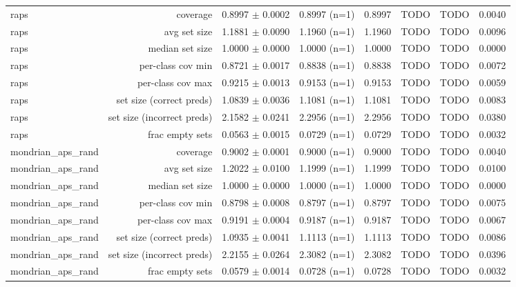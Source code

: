 \begin{table}
\begin{tabular}{lrrrrrrr}
raps & coverage & 0.8997 $\pm$ 0.0002 & 0.8997 (n=1) & 0.8997 & TODO & TODO & 0.0040 \\
raps & avg set size & 1.1881 $\pm$ 0.0090 & 1.1960 (n=1) & 1.1960 & TODO & TODO & 0.0096 \\
raps & median set size & 1.0000 $\pm$ 0.0000 & 1.0000 (n=1) & 1.0000 & TODO & TODO & 0.0000 \\
raps & per-class cov min & 0.8721 $\pm$ 0.0017 & 0.8838 (n=1) & 0.8838 & TODO & TODO & 0.0072 \\
raps & per-class cov max & 0.9215 $\pm$ 0.0013 & 0.9153 (n=1) & 0.9153 & TODO & TODO & 0.0059 \\
raps & set size (correct preds) & 1.0839 $\pm$ 0.0036 & 1.1081 (n=1) & 1.1081 & TODO & TODO & 0.0083 \\
raps & set size (incorrect preds) & 2.1582 $\pm$ 0.0241 & 2.2956 (n=1) & 2.2956 & TODO & TODO & 0.0380 \\
raps & frac empty sets & 0.0563 $\pm$ 0.0015 & 0.0729 (n=1) & 0.0729 & TODO & TODO & 0.0032 \\
mondrian\_aps\_rand & coverage & 0.9002 $\pm$ 0.0001 & 0.9000 (n=1) & 0.9000 & TODO & TODO & 0.0040 \\
mondrian\_aps\_rand & avg set size & 1.2022 $\pm$ 0.0100 & 1.1999 (n=1) & 1.1999 & TODO & TODO & 0.0100 \\
mondrian\_aps\_rand & median set size & 1.0000 $\pm$ 0.0000 & 1.0000 (n=1) & 1.0000 & TODO & TODO & 0.0000 \\
mondrian\_aps\_rand & per-class cov min & 0.8798 $\pm$ 0.0008 & 0.8797 (n=1) & 0.8797 & TODO & TODO & 0.0075 \\
mondrian\_aps\_rand & per-class cov max & 0.9191 $\pm$ 0.0004 & 0.9187 (n=1) & 0.9187 & TODO & TODO & 0.0067 \\
mondrian\_aps\_rand & set size (correct preds) & 1.0935 $\pm$ 0.0041 & 1.1113 (n=1) & 1.1113 & TODO & TODO & 0.0086 \\
mondrian\_aps\_rand & set size (incorrect preds) & 2.2155 $\pm$ 0.0264 & 2.3082 (n=1) & 2.3082 & TODO & TODO & 0.0396 \\
mondrian\_aps\_rand & frac empty sets & 0.0579 $\pm$ 0.0014 & 0.0728 (n=1) & 0.0728 & TODO & TODO & 0.0032 \\
\bottomrule
\end{tabular}
\end{table}

